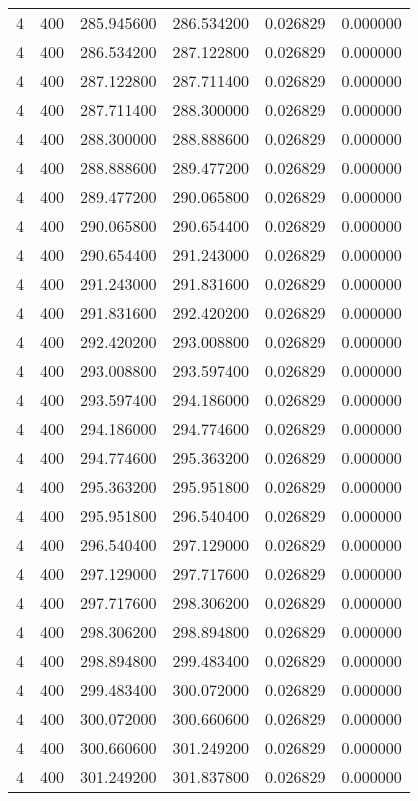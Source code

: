 \begin{longtable}{rrrrrr}
4 & 400 & 285.945600 & 286.534200 & 0.026829 & 0.000000 \\
4 & 400 & 286.534200 & 287.122800 & 0.026829 & 0.000000 \\
4 & 400 & 287.122800 & 287.711400 & 0.026829 & 0.000000 \\
4 & 400 & 287.711400 & 288.300000 & 0.026829 & 0.000000 \\
4 & 400 & 288.300000 & 288.888600 & 0.026829 & 0.000000 \\
4 & 400 & 288.888600 & 289.477200 & 0.026829 & 0.000000 \\
4 & 400 & 289.477200 & 290.065800 & 0.026829 & 0.000000 \\
4 & 400 & 290.065800 & 290.654400 & 0.026829 & 0.000000 \\
4 & 400 & 290.654400 & 291.243000 & 0.026829 & 0.000000 \\
4 & 400 & 291.243000 & 291.831600 & 0.026829 & 0.000000 \\
4 & 400 & 291.831600 & 292.420200 & 0.026829 & 0.000000 \\
4 & 400 & 292.420200 & 293.008800 & 0.026829 & 0.000000 \\
4 & 400 & 293.008800 & 293.597400 & 0.026829 & 0.000000 \\
4 & 400 & 293.597400 & 294.186000 & 0.026829 & 0.000000 \\
4 & 400 & 294.186000 & 294.774600 & 0.026829 & 0.000000 \\
4 & 400 & 294.774600 & 295.363200 & 0.026829 & 0.000000 \\
4 & 400 & 295.363200 & 295.951800 & 0.026829 & 0.000000 \\
4 & 400 & 295.951800 & 296.540400 & 0.026829 & 0.000000 \\
4 & 400 & 296.540400 & 297.129000 & 0.026829 & 0.000000 \\
4 & 400 & 297.129000 & 297.717600 & 0.026829 & 0.000000 \\
4 & 400 & 297.717600 & 298.306200 & 0.026829 & 0.000000 \\
4 & 400 & 298.306200 & 298.894800 & 0.026829 & 0.000000 \\
4 & 400 & 298.894800 & 299.483400 & 0.026829 & 0.000000 \\
4 & 400 & 299.483400 & 300.072000 & 0.026829 & 0.000000 \\
4 & 400 & 300.072000 & 300.660600 & 0.026829 & 0.000000 \\
4 & 400 & 300.660600 & 301.249200 & 0.026829 & 0.000000 \\
4 & 400 & 301.249200 & 301.837800 & 0.026829 & 0.000000 \\

\end{longtable}

